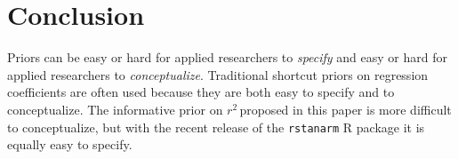 \documentclass[11pt]{article}
\newcommand{\Rsq}{$r^2\,$}
\begin{document}
\section{Conclusion}

Priors can be easy or hard for applied researchers to \emph{specify} and easy or
hard for applied researchers to \emph{conceptualize}. Traditional shortcut
priors on regression coefficients are often used because they are both easy to
specify and to conceptualize. The informative prior on \Rsq proposed in this
paper is more difficult to conceptualize, but with the recent release of the
{\tt rstanarm} R package it is equally easy to specify.


\nocite{guan}
\nocite{Rcore}
\nocite{HSAUR3-package}



\end{document}

